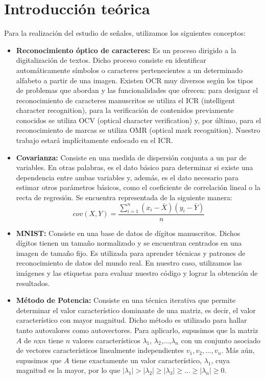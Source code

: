 \documentclass[10pt, a4paper]{article}
\begin{document}
\section{Introducci\'on te\'orica}
Para la realización del estudio de señales, utilizamos los siguientes conceptos:
\begin{itemize}
\item {\textbf{Reconocimiento óptico de caracteres:}} Es un proceso dirigido a la digitalización de textos. Dicho proceso consiste en identificar automáticamente símbolos o caracteres pertenecientes a un determinado alfabeto a partir de una imagen. Existen OCR muy diversos según los tipos de problemas que abordan y las funcionalidades que ofrecen: para designar el reconocimiento de caracteres manuscritos se utiliza el ICR (intelligent character recognition), para la verificación de contenidos previamente conocidos se utiliza OCV (optical character verification) y, por último, para el reconocimiento de marcas se utiliza OMR (optical mark recognition). Nuestro trabajo estará implícitamente enfocado en el ICR. 
\item {\textbf{Covarianza:}} Consiste en una medida de dispersión conjunta a un par de variables. En otras palabras, es el dato básico para determinar si existe una dependencia entre ambas variables y, además, es el dato necesario para estimar otros parámetros básicos, como el coeficiente de correlación lineal o la recta de regresión. Se encuentra representada de la siguiente manera: $$cov(X, Y) = \frac{\sum_{i=1}^{n} (x_i - \bar{X})(y_i - \bar{Y})}{n}$$
\item {\textbf{MNIST:}} Consiste en una base de datos de dígitos manuscritos. Dichos dígitos tienen un tamaño normalizado y se encuentran centrados en una imagen de tamaño fijo. Es utilizada para aprender técnicas y patrones de reconocimiento de datos del mundo real. En nuestro caso, utilizamos las imágenes y las etiquetas para evaluar nuestro código y lograr la obtención de resultados.
\item {\textbf{Método de Potencia:}} Consiste en una técnica iterativa que permite determinar el valor característico dominante de una matriz, es decir, el valor característico con mayor magnitud. Dicho método es utilizado para hallar tanto autovalores como autovectores. Para aplicarlo, supusimos que la matriz $A$ de $n$x$n$ tiene $n$ valores característicos $\lambda_{1}$, $\lambda_{2}$,...,$\lambda_{n}$ con un conjunto asociado de vectores característicos linealmente independientes ${v_{1}, v_{2},...,v_{n}}$. Más aún, supusimos que $A$ tiene exactamente un valor característico, $\lambda_{1}$, cuya magnitud es la mayor, por lo que $|\lambda_{1}| > |\lambda_{2}| \geq |\lambda_{3}| \geq ... \geq |\lambda_{n}| \geq 0$.

\end{itemize}
\end{document}
